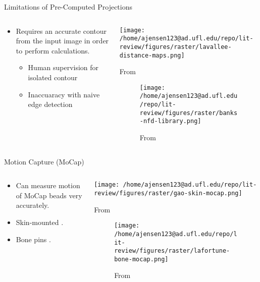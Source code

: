 \documentclass[presentation, aspectratio=1610]{beamer}
\begin{document}
\begin{frame}[label={sec:orga59a0b7}]{Limitations of Pre-Computed Projections}
\begin{columns}
\begin{column}{0.5\columnwidth}
\begin{itemize}
\item Requires an accurate contour from the input image in order to perform calculations.
\begin{itemize}
\item Human supervision for isolated contour
\item Inaccuaracy with naive edge detection
\end{itemize}
\end{itemize}
\end{column}
\begin{column}{0.6\columnwidth}
\begin{center}
\texttt{[image: /home/ajensen123@ad.ufl.edu/repo/lit-review/figures/raster/lavallee-distance-maps.png]}
\caption{From \autocite{lavalleeRecoveringPositionOrientation1995}}
\end{center}
\vspace{-0.25in}
\begin{figure}[htbp]
\centering
\texttt{[image: /home/ajensen123@ad.ufl.edu/repo/lit-review/figures/raster/banks-nfd-library.png]}
\caption{From \autocite{banksAccurateMeasurementThreedimensional1996}}
\end{figure}
\end{column}
\end{columns}
\end{frame}
\begin{frame}[label={sec:org390bda7}]{Motion Capture (MoCap)}
\begin{columns}
\begin{column}{0.5\columnwidth}
\begin{itemize}
\item Can measure motion of MoCap beads very accurately.
\item Skin-mounted \autocites{gaoInvestigationSoftTissue2008}[][]{kuoInfluenceSoftTissue2011}[][]{linEffectsSoftTissue2016}.
\item Bone pins \autocite{lafortuneThreedimensionalKinematicsHuman1992}.
\end{itemize}
\end{column}
\begin{column}{0.6\columnwidth}
\begin{center}
\texttt{[image: /home/ajensen123@ad.ufl.edu/repo/lit-review/figures/raster/gao-skin-mocap.png]}
\caption{From \autocite{gaoInvestigationSoftTissue2008}}
\end{center}
\vspace{-0.25in}
\begin{figure}[htbp]
\centering
\texttt{[image: /home/ajensen123@ad.ufl.edu/repo/lit-review/figures/raster/lafortune-bone-mocap.png]}
\caption{From \autocite{lafortuneThreedimensionalKinematicsHuman1992}}
\end{figure}
\end{column}
\end{columns}
\end{frame}
\end{document}
